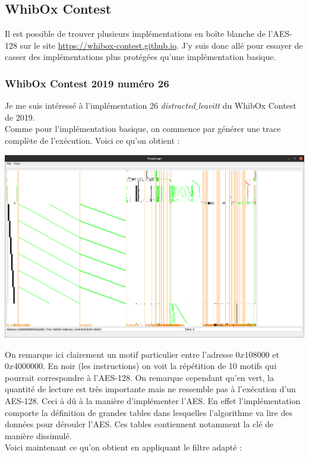 \documentclass[10pt,a4paper]{article}
\begin{document}
\subsection{WhibOx Contest}
Il est possible de trouver plusieurs implémentations en boîte blanche de l'AES-128 sur le site \href{https://whibox-contest.github.io}{https://whibox-contest.github.io}. J'y suis donc allé pour essayer de casser des implémentations plus protégées qu'une implémentation basique.

\subsubsection{WhibOx Contest 2019 numéro 26}
Je me suis intéressé à l'implémentation 26 \textit{distracted$\_$leavitt} du WhibOx Contest de 2019.\\
Comme pour l'implémentation basique, on commence par générer une trace complète de l'exécution. Voici ce qu'on obtient :

\begin{center}
\includegraphics[scale=0.11]{Images/26_sans_filtre.png}\\
\end{center}
On remarque ici clairement un motif particulier entre l'adresse $0x108000$ et $0x4000000$. En noir (les instructions) on voit la répétition de 10 motifs qui pourrait correspondre à l'AES-128. On remarque cependant qu'en vert, la quantité de lecture est très importante mais ne ressemble pas à l'exécution d'un AES-128. Ceci à dû à la manière d'implémenter l'AES. En effet l'implémentation comporte la définition de grandes tables dans lesquelles l'algorithme va lire des données pour dérouler l'AES. Ces tables contiennent notamment la clé de manière dissimulé.\\
Voici maintenant ce qu'on obtient en appliquant le filtre adapté :
\end{document}
